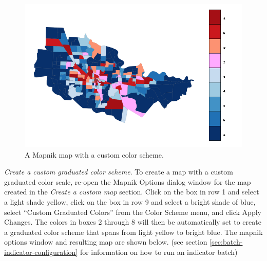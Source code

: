 \begin{figure}[hbp]
\begin{center}
\includegraphics[width=\textwidth]{part-gui/images/sample-map-custom-settings.png}
\end{center}
\caption{A Mapnik map with a custom color scheme.}
\label{fig:sample-map-custom-settings}
\end{figure}
\clearpage

\emph{Create a custom graduated color scheme}. 
To create a map with a custom graduated color scale, 
re-open the Mapnik Options dialog window for the map 
created in the \emph{Create a custom map} section.  Click 
on the box in row 1 and select a light shade yellow, click on 
the box in row 9 and select a bright shade of blue, select 
``Custom Graduated Colors'' from the Color Scheme menu, and click 
Apply Changes. The colors in boxes 2 through 8 will then be automatically set 
to create a graduated color scheme that spans from light 
yellow to bright blue. The mapnik options window and resulting 
map are shown below. (see section \ref{sec:batch-indicator-configuration}
for information on how to run an indicator batch)

